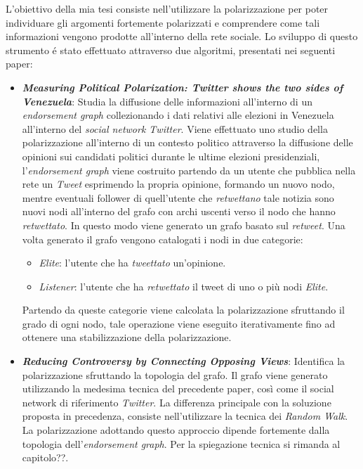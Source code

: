 L'obiettivo della mia tesi consiste nell'utilizzare la polarizzazione per poter individuare gli argomenti fortemente polarizzati e comprendere come tali informazioni vengono prodotte all'interno della rete sociale.
Lo sviluppo di questo strumento \'e stato effettuato attraverso due algoritmi, presentati nei seguenti paper:
\begin{itemize}
\item \textbf{\textit{Measuring Political Polarization: Twitter shows the two sides of Venezuela}}:
Studia la diffusione delle informazioni all'interno di un \textit{endorsement graph} collezionando i dati relativi alle elezioni in Venezuela all'interno del \textit{social network Twitter}. Viene effettuato uno studio della polarizzazione all'interno di un contesto politico attraverso la diffusione delle opinioni sui candidati politici durante le ultime elezioni presidenziali, l'\textit{endorsement graph} viene costruito partendo da un utente che pubblica nella rete un \textit{Tweet} esprimendo la propria opinione, formando un nuovo nodo, mentre eventuali follower di quell'utente che \textit{retwettano} tale notizia sono nuovi nodi all'interno del grafo con archi uscenti verso il nodo che hanno \textit{retwettato}. In questo modo viene generato un grafo basato sul \textit{retweet}.
Una volta generato il grafo vengono catalogati i nodi in due categorie:
\begin{itemize}
\item \textit{Elite}: l'utente che ha \textit{tweettato} un'opinione.
\item \textit{Listener}: l'utente che ha \textit{retwettato} il tweet di uno o più nodi \textit{Elite}.
\end{itemize}
Partendo da queste categorie viene calcolata la polarizzazione sfruttando il grado di ogni nodo, tale operazione viene eseguito iterativamente fino ad ottenere una stabilizzazione della polarizzazione.

\item \textbf{\textit{Reducing Controversy by Connecting Opposing Views}}:
Identifica la polarizzazione sfruttando la topologia del grafo. Il grafo viene generato utilizzando la medesima tecnica del precedente paper, così come il social network di riferimento \textit{Twitter}. %
La differenza principale con la soluzione proposta in precedenza, consiste nell'utilizzare la tecnica dei \textit{Random Walk}. La polarizzazione adottando questo approccio dipende fortemente dalla topologia dell'\textit{endorsement graph}. Per la spiegazione tecnica si rimanda al capitolo??.
\end{itemize}

